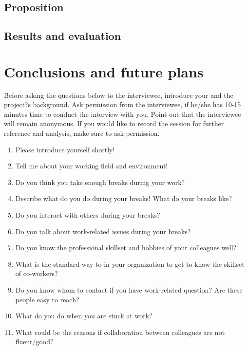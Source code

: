 \documentclass[english]{tktltiki}
\begin{document}


\subsection{Proposition}


\subsection{Results and evaluation}

\section{Conclusions and future plans}

\pagebreak
\nocite{*}




\lastpage
\appendices
\pagestyle{empty}
\singlespacing

\label{appendix:interview_questions}
Before asking the questions below to the interviewee, introduce your and the project?s background. Ask permission from the interviewee, if he/she has 10-15 minutes time to conduct the interview with you. Point out that the interviewee will remain anonymous. If you would like to record the session for further reference and analysis, make sure to ask permission.

\begin{enumerate}
\item Please introduce yourself shortly!
\item Tell me about your working field and environment! 
\item Do you think you take enough breaks during your work? 
\item Describe what do you do during your breaks! What do your breaks like? 
\item Do you interact with others during your breaks? 
\item Do you talk about work-related issues during your breaks? 
\item Do you know the professional skillset and hobbies of your colleagues well?
\item What is the standard way to in your organization to get to know the skillset of co-workers? 
\item Do you know whom to contact if you have work-related question? Are these people easy to reach? 
\item What do you do when you are stuck at work? 
\item What could be the reasons if collaboration between colleagues are not fluent/good? 
\end{enumerate}
\end{document}
